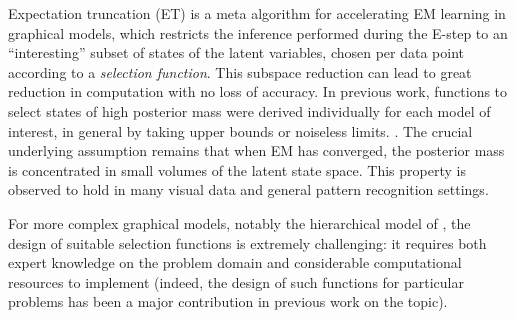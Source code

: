 Expectation truncation (ET) \citep{LuckeEggert2010} is a meta algorithm for accelerating EM learning
in graphical models, which restricts the inference performed during the E-step
to an ``interesting'' subset of states of the latent variables,  %
chosen per data point according to a \emph{selection function}.
This subspace reduction can lead to great reduction in computation with no loss of accuracy.
In previous work, functions to select states of high posterior mass were 
derived individually for each model of interest, in general by taking upper bounds or noiseless limits. 
\citep{LuckeEggert2010,SheltonEtAl2012,BornscheinEtAl2013,SheikhEtAl2014}.
The crucial underlying assumption remains that 
when EM has converged,
the posterior mass is  concentrated in small volumes of the latent state space.
This property is observed to hold in many visual data and general pattern recognition settings.

For more complex graphical models, notably the hierarchical model of \citep{DaiLucke2014},  the design of suitable selection functions
is extremely challenging: it requires both expert knowledge
on the problem domain and considerable computational resources to implement
 (indeed, the design of such functions for  particular problems
has been a major contribution in previous work on the topic).


